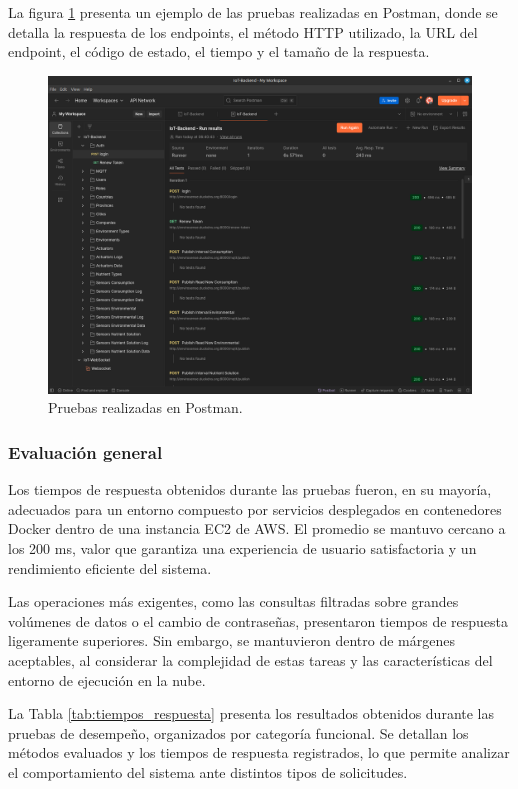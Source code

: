 La figura \ref{fig:postman} presenta un ejemplo de las pruebas realizadas en
Postman, donde se detalla la respuesta de los endpoints, el método HTTP
utilizado, la URL del endpoint, el código de estado, el tiempo y el tamaño de
la respuesta.

\begin{figure}[H]
    \centering
    \includegraphics[width=\textwidth]{Images/38_postman.png}
    \caption[Pruebas realizadas en Postman]{Pruebas realizadas en Postman.}
    \label{fig:postman}
\end{figure}

\subsubsection{Evaluación general}

Los tiempos de respuesta obtenidos durante las pruebas fueron, en su mayoría,
adecuados para un entorno compuesto por servicios desplegados en contenedores
Docker dentro de una instancia EC2 de AWS. El promedio se mantuvo cercano a los
200 ms, valor que garantiza una experiencia de usuario satisfactoria y un
rendimiento eficiente del sistema.

Las operaciones más exigentes, como las consultas filtradas sobre grandes
volúmenes de datos o el cambio de contraseñas, presentaron tiempos de respuesta
ligeramente superiores. Sin embargo, se mantuvieron dentro de márgenes
aceptables, al considerar la complejidad de estas tareas y las características
del entorno de ejecución en la nube.

La Tabla \ref{tab:tiempos_respuesta} presenta los resultados obtenidos durante
las pruebas de desempeño, organizados por categoría funcional. Se detallan los
métodos evaluados y los tiempos de respuesta registrados, lo que permite
analizar el comportamiento del sistema ante distintos tipos de solicitudes.

